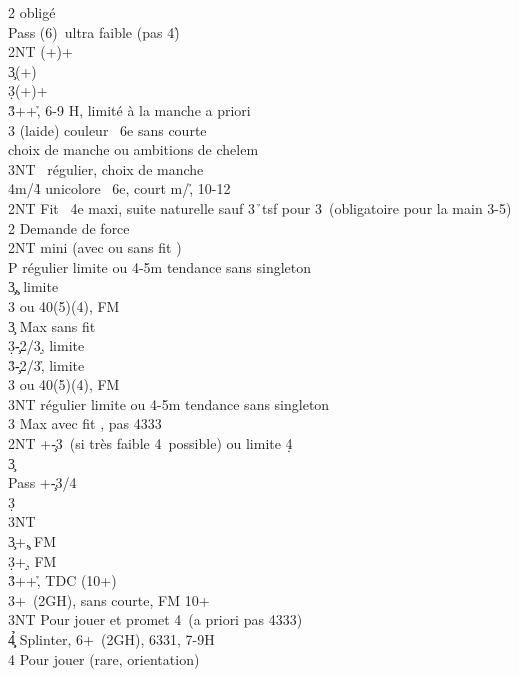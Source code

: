 \documentclass[a4paper]{article}
\begin{document}
\begin{bidtable}
2\s \> obligé\+\\
Pass (6)\s\ ultra faible (pas 4\h )\\
2NT (+)+\c \\
3\c {}(+)\d \\
3\d {}(+)+\d \\
3\h {}++\h , 6-9 H, limité à la manche a priori\\
3\s \> (laide) couleur \s\ 6e sans courte\+\\
choix \> de manche ou ambitions de chelem\-\\
3NT \s\ régulier, choix de manche\\
4m/4\h \> unicolore \s\ 6e, court m/\h , 10-12\-\\
2NT \> Fit \s\ 4e maxi, suite naturelle sauf 3\h\ tsf pour 3\s\ (obligatoire pour la main 3-5)\-\\
2\s \> Demande de force\+\\
2NT \> mini (avec ou sans fit \s )\+\\
P	régulier \> limite ou 4\s -5m tendance sans singleton\\
3\c {}\c , limite\\
3\s {} ou 40(5)(4), FM\-\\
3\c \> Max sans fit \s \+\\
3\d {}\c -2/3\d , limite\\
3\h {}\c -2/3\h , limite\\
3\s {} ou 40(5)(4), FM\\
3NT \> régulier limite ou 4\s -5m tendance sans singleton\-\\
3\s \> Max avec fit \s , pas 4333\-\\
2NT +\c -3\s\ (si très faible 4\s\ possible) ou limite 4\d \+\\
3\c\+\\
Pass +\c -3/4\s \\
3\d {}\d \\
3NT\-\-\\
3\c {}+\c , FM\\
3\d {}+\d , FM\\
3\h {}++\h , TDC (10+)\\
3\s {}+\s\ (2GH), sans courte, FM 10+\\
3NT \> Pour jouer et promet 4\s\ (a priori pas 4333)\\
4\c\d\h \> Splinter, 6+\s\ (2GH), 6331, 7-9H\\
4\s \> Pour jouer (rare, orientation)\-
\end{bidtable}
\end{document}
